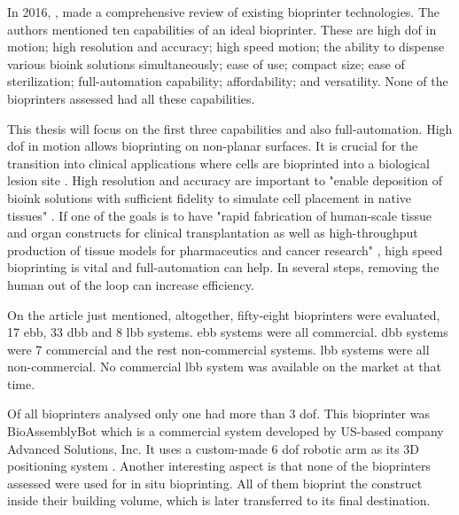 In 2016, \citeauthor{Ozbolat2017_evaluation_bioprinter_tech} \cite{Ozbolat2017_evaluation_bioprinter_tech}, made a comprehensive review of existing bioprinter technologies. The authors mentioned ten capabilities of an ideal bioprinter. These are high \gls{dof} in motion; high resolution and accuracy; high speed motion; the ability to dispense various bioink solutions simultaneously; ease of use; compact size; ease of sterilization; full-automation capability; affordability; and versatility. None of the bioprinters assessed had all these capabilities.

This thesis will focus on the first three capabilities and also full-automation. High \gls{dof} in motion allows bioprinting on non-planar surfaces. It is crucial for the transition into clinical applications where cells are bioprinted into a biological lesion site \cite{Ozbolat2017_evaluation_bioprinter_tech}. High resolution and accuracy are important to "enable deposition of bioink solutions with sufficient fidelity to simulate cell placement in native tissues" \cite{Ozbolat2017_evaluation_bioprinter_tech}. If one of the goals is to have "rapid fabrication of human-scale tissue and organ constructs for clinical transplantation as well as high-throughput production of tissue models for pharmaceutics and cancer research" \cite{Ozbolat2017_evaluation_bioprinter_tech}, high speed bioprinting is vital and full-automation can help. In several steps, removing the human out of the loop can increase efficiency.

On the article just mentioned, altogether, fifty-eight bioprinters were evaluated, 17 \gls{ebb}, 33 \gls{dbb} and 8 \gls{lbb} systems. \gls{ebb} systems were all commercial. \gls{dbb} systems were 7 commercial and the rest non-commercial systems. \gls{lbb} systems were all non-commercial. No commercial \gls{lbb} system was available on the market at that time.

Of all bioprinters analysed only one had more than 3 \gls{dof}. This bioprinter was BioAssemblyBot\textregistered{} which is a commercial system developed by US-based company Advanced Solutions, Inc. It uses a custom-made 6 \gls{dof} robotic arm as its 3D positioning system \cite{Advanced2020_bioassemblybot}. Another interesting aspect is that none of the bioprinters assessed were used for in situ bioprinting. All of them bioprint the construct inside their building volume, which is later transferred to its final destination.

